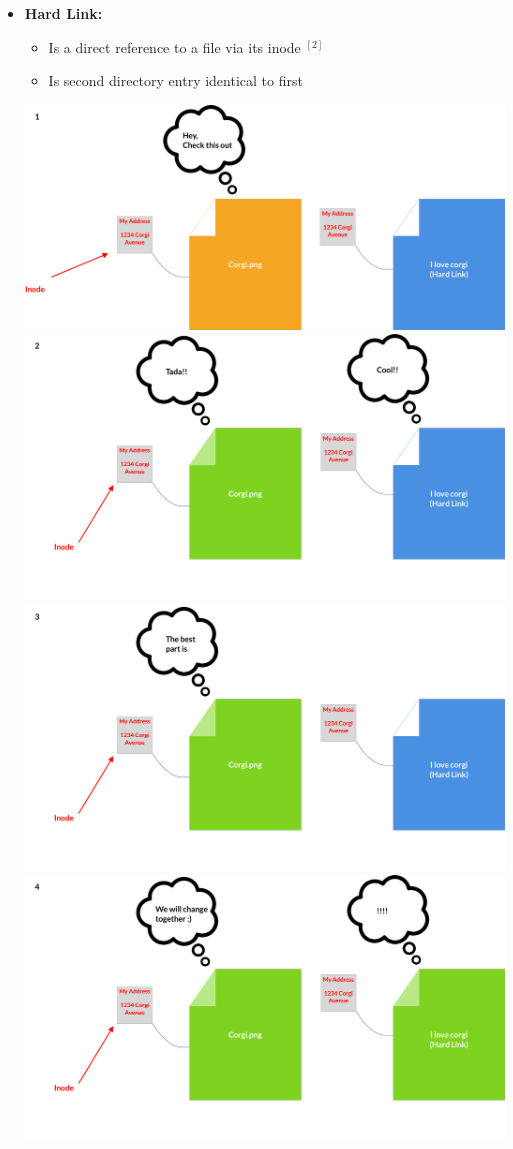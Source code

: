 \documentclass[12pt]{article}
\begin{document}
\begin{itemize}
\begin{itemize}
        \item \textbf{Hard Link:}
        \begin{itemize}
            \item Is a direct reference to a file via its inode $^{[2]}$
            \item Is second directory entry identical to first
        \end{itemize}

        \begin{center}
        \includegraphics[width=0.8\linewidth]{images/week_8_notes_1_10.png}
        \includegraphics[width=0.8\linewidth]{images/week_8_notes_1_11.png}
        \includegraphics[width=0.8\linewidth]{images/week_8_notes_1_12.png}
        \includegraphics[width=0.8\linewidth]{images/week_8_notes_1_13.png}
        \end{center}
    \end{itemize}


\end{itemize}
\end{document}
